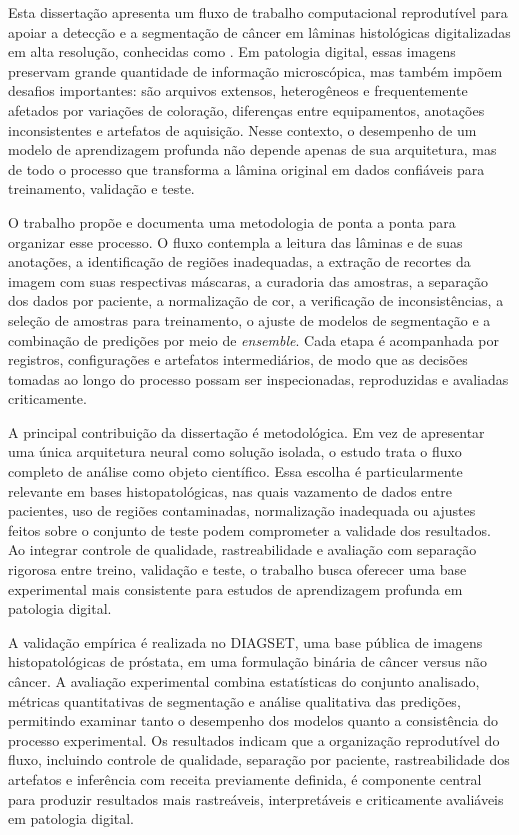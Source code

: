 \begin{resumo} Esta dissertação apresenta um fluxo de trabalho computacional reprodutível para apoiar a detecção e a segmentação de câncer em lâminas histológicas digitalizadas em alta resolução, conhecidas como . Em patologia digital, essas imagens preservam grande quantidade de informação microscópica, mas também impõem desafios importantes: são arquivos extensos, heterogêneos e frequentemente afetados por variações de coloração, diferenças entre equipamentos, anotações inconsistentes e artefatos de aquisição. Nesse contexto, o desempenho de um modelo de aprendizagem profunda não depende apenas de sua arquitetura, mas de todo o processo que transforma a lâmina original em dados confiáveis para treinamento, validação e teste. 

O trabalho propõe e documenta uma metodologia de ponta a ponta para organizar esse processo. O fluxo contempla a leitura das lâminas e de suas anotações, a identificação de regiões inadequadas, a extração de recortes da imagem com suas respectivas máscaras, a curadoria das amostras, a separação dos dados por paciente, a normalização de cor, a verificação de inconsistências, a seleção de amostras para treinamento, o ajuste de modelos de segmentação e a combinação de predições por meio de \textit{ensemble}. Cada etapa é acompanhada por registros, configurações e artefatos intermediários, de modo que as decisões tomadas ao longo do processo possam ser inspecionadas, reproduzidas e avaliadas criticamente.

A principal contribuição da dissertação é metodológica. Em vez de apresentar uma única arquitetura neural como solução isolada, o estudo trata o fluxo completo de análise como objeto científico. Essa escolha é particularmente relevante em bases histopatológicas, nas quais vazamento de dados entre pacientes, uso de regiões contaminadas, normalização inadequada ou ajustes feitos sobre o conjunto de teste podem comprometer a validade dos resultados. Ao integrar controle de qualidade, rastreabilidade e avaliação com separação rigorosa entre treino, validação e teste, o trabalho busca oferecer uma base experimental mais consistente para estudos de aprendizagem profunda em patologia digital. 

A validação empírica é realizada no DIAGSET, uma base pública de imagens histopatológicas de próstata, em uma formulação binária de câncer versus não câncer. A avaliação experimental combina estatísticas do conjunto analisado, métricas quantitativas de segmentação e análise qualitativa das predições, permitindo examinar tanto o desempenho dos modelos quanto a consistência do processo experimental. Os resultados indicam que a organização reprodutível do fluxo, incluindo controle de qualidade, separação por paciente, rastreabilidade dos artefatos e inferência com receita previamente definida, é componente central para produzir resultados mais rastreáveis, interpretáveis e criticamente avaliáveis em patologia digital. \end{resumo}

